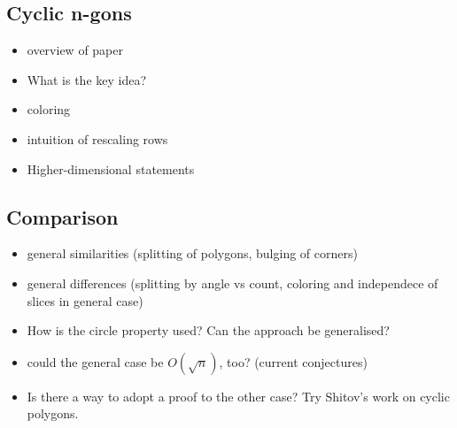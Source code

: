 \subsection{Cyclic n-gons}

\begin{itemize}
  \item overview of paper
  \item What is the key idea?
  \item coloring
  \item intuition of rescaling rows
  \item Higher-dimensional statements
\end{itemize}



\subsection{Comparison}

\begin{itemize}
  \item general similarities (splitting of polygons, bulging of corners)
  \item general differences (splitting by angle vs count, coloring and independece of slices in general case)
  \item How is the circle property used? Can the approach be generalised?
  \item could the general case be $O(\sqrt{n})$, too? (current conjectures)
  \item Is there a way to adopt a proof to the other case? Try Shitov's work on cyclic polygons.
\end{itemize}

